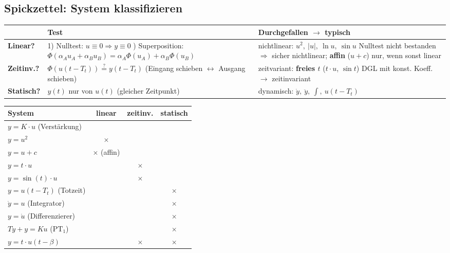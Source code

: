 \subsection{Spickzettel: System klassifizieren}

\begingroup
\small
\renewcommand{\arraystretch}{1.25}
\begin{tabularx}{\columnwidth}{@{}lXX@{}}
	\toprule
	& \textbf{Test} & \textbf{Durchgefallen $\rightarrow$ typisch} \\
	\midrule
	\textbf{Linear?}
		& 1) Nulltest: $u \equiv 0 \Rightarrow y \equiv 0$ \newline
		  2) Superposition: $\Phi(\alpha_A u_A + \alpha_B u_B) = \alpha_A \Phi(u_A) + \alpha_B \Phi(u_B)$
		& nichtlinear: $u^2,\ |u|,\ \ln u,\ \sin u$ \newline
		  Nulltest nicht bestanden $\Rightarrow$ sicher nichtlinear; \textbf{affin} ($u + c$) nur, wenn sonst linear \\
	\textbf{Zeitinv.?}
		& $\Phi(u(t - T_t)) \overset{?}{=} y(t - T_t)$ \newline
		  (Eingang schieben $\leftrightarrow$ Ausgang schieben)
		& zeitvariant: \textbf{freies $t$} ($t \cdot u$, $\sin t$) \newline
		  DGL mit konst. Koeff. $\rightarrow$ zeitinvariant \\
	\textbf{Statisch?}
		& $y(t)$ nur von $u(t)$ (gleicher Zeitpunkt)
		& dynamisch: $\dot y,\ \ddot y,\ \int,\ u(t - T_t)$ \\
	\bottomrule
\end{tabularx}

\vspace{0.2cm}

\begin{tabularx}{\columnwidth}{@{}Xccc@{}}
	\toprule
	\textbf{System} & \textbf{linear} & \textbf{zeitinv.} & \textbf{statisch} \\
	\midrule
	$y = K \cdot u$ (Verstärkung)	& \checkmark & \checkmark & \checkmark \\
	$y = u^2$ 						& $\times$ & \checkmark & \checkmark \\
	$y = u + c$ 					& $\times$ (affin) & \checkmark & \checkmark \\
	$y = t \cdot u$ 				& \checkmark & $\times$ & \checkmark \\
	$y = \sin(t) \cdot u$ 			& \checkmark & $\times$ & \checkmark \\
	$y = u(t - T_t)$ (Totzeit)		& \checkmark & \checkmark & $\times$ \\
	$\dot y = u$ (Integrator)		& \checkmark & \checkmark & $\times$ \\
	$y = \dot u$ (Differenzierer)	& \checkmark & \checkmark & $\times$ \\
	$T \dot y + y = K u$ ($\text{PT}_1$)	& \checkmark & \checkmark & $\times$ \\
	$y = t \cdot u(t - \beta)$ 		& \checkmark & $\times$ & $\times$ \\
	\bottomrule
\end{tabularx}
\endgroup


